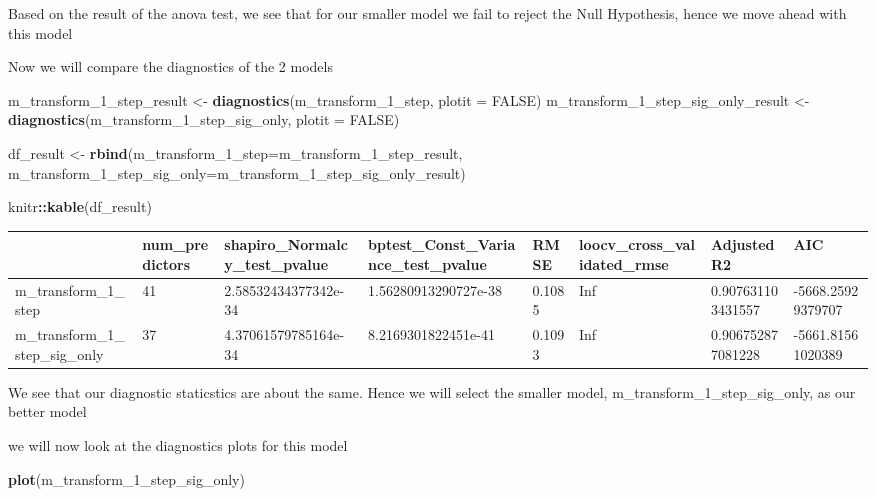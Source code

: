 \documentclass[
]{article}
\newenvironment{Shaded}{\begin{snugshade}}{\end{snugshade}}
\newcommand{\DataTypeTok}[1]{\textcolor[rgb]{0.13,0.29,0.53}{#1}}
\newcommand{\DecValTok}[1]{\textcolor[rgb]{0.00,0.00,0.81}{#1}}
\newcommand{\KeywordTok}[1]{\textcolor[rgb]{0.13,0.29,0.53}{\textbf{#1}}}
\newcommand{\NormalTok}[1]{#1}
\newcommand{\OperatorTok}[1]{\textcolor[rgb]{0.81,0.36,0.00}{\textbf{#1}}}
\newcommand{\OtherTok}[1]{\textcolor[rgb]{0.56,0.35,0.01}{#1}}
\newcommand{\StringTok}[1]{\textcolor[rgb]{0.31,0.60,0.02}{#1}}
\begin{document}
Based on the result of the anova test, we see that for our smaller model we fail to reject the Null Hypothesis, hence we move ahead with this model

Now we will compare the diagnostics of the 2 models

\begin{Shaded}
\begin{Highlighting}[]
\NormalTok{m_transform_}\DecValTok{1}\NormalTok{_step_result <-}\StringTok{ }\KeywordTok{diagnostics}\NormalTok{(m_transform_}\DecValTok{1}\NormalTok{_step, }\DataTypeTok{plotit =} \OtherTok{FALSE}\NormalTok{)}
\NormalTok{m_transform_}\DecValTok{1}\NormalTok{_step_sig_only_result <-}\StringTok{ }\KeywordTok{diagnostics}\NormalTok{(m_transform_}\DecValTok{1}\NormalTok{_step_sig_only, }\DataTypeTok{plotit =} \OtherTok{FALSE}\NormalTok{)}

\NormalTok{df_result <-}\StringTok{ }\KeywordTok{rbind}\NormalTok{(}\DataTypeTok{m_transform_1_step=}\NormalTok{m_transform_}\DecValTok{1}\NormalTok{_step_result, }\DataTypeTok{m_transform_1_step_sig_only=}\NormalTok{m_transform_}\DecValTok{1}\NormalTok{_step_sig_only_result)}

\NormalTok{knitr}\OperatorTok{::}\KeywordTok{kable}\NormalTok{(df_result)}
\end{Highlighting}
\end{Shaded}

\begin{tabular}{l|l|l|l|l|l|l|l}
\hline
  & num\_predictors & shapiro\_Normalcy\_test\_pvalue & bptest\_Const\_Variance\_test\_pvalue & RMSE & loocv\_cross\_validated\_rmse & AdjustedR2 & AIC\\
\hline
m\_transform\_1\_step & 41 & 2.58532434377342e-34 & 1.56280913290727e-38 & 0.1085 & Inf & 0.907631103431557 & -5668.25929379707\\
\hline
m\_transform\_1\_step\_sig\_only & 37 & 4.37061579785164e-34 & 8.2169301822451e-41 & 0.1093 & Inf & 0.906752877081228 & -5661.81561020389\\
\hline
\end{tabular}

We see that our diagnostic staticstics are about the same. Hence we will select the smaller model, m\_transform\_1\_step\_sig\_only, as our better model

we will now look at the diagnostics plots for this model

\begin{Shaded}
\begin{Highlighting}[]
\KeywordTok{plot}\NormalTok{(m_transform_}\DecValTok{1}\NormalTok{_step_sig_only)}
\end{Highlighting}
\end{Shaded}
\end{document}
